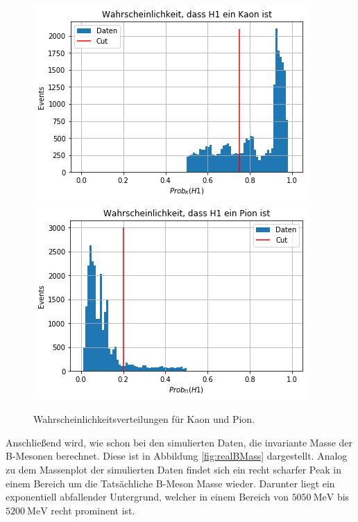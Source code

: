 \begin{figure}[!htb]
  \centering
    \includegraphics[width=\linewidth]{plots/probability_kaon1.png}
    \label{fig:probK}
  \endminipage\hfill
    \includegraphics[width=\linewidth]{plots/probability_pion1.png}
    \label{fig:probPi}
  \endminipage
  \caption{Wahrscheinlichkeitsverteilungen f\"ur Kaon und Pion.}
  \label{fig:probCuts}
\end{figure}

Anschlie\ss end wird, wie schon bei den simulierten Daten, die invariante Masse der B-Mesonen berechnet. Diese ist in Abbildung \ref{fig:realBMass} dargestellt.
Analog zu dem Massenplot der simulierten Daten findet sich ein recht scharfer Peak in einem Bereich um die Tats\"achliche B-Meson Masse wieder. Darunter liegt ein exponentiell abfallender Untergrund, welcher in einem Bereich von $\SI{5050}{\mega\electronvolt}$ bis $\SI{5200}{\mega\electronvolt}$ recht prominent ist.

